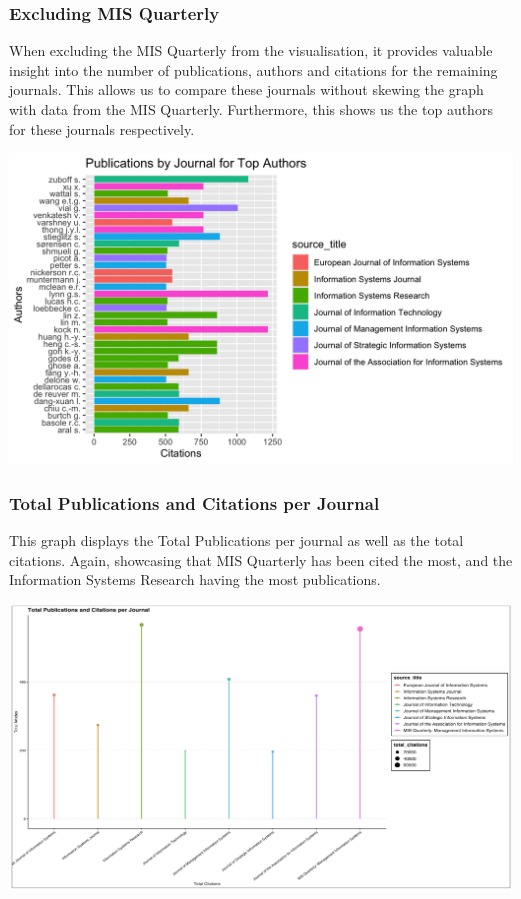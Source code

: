 \documentclass[
  letterpaper,
  DIV=11,
  numbers=noendperiod]{scrartcl}
\begin{document}
\hypertarget{excluding-mis-quarterly}{%
\subsubsection{Excluding MIS Quarterly}\label{excluding-mis-quarterly}}

When excluding the MIS Quarterly from the visualisation, it provides
valuable insight into the number of publications, authors and citations
for the remaining journals. This allows us to compare these journals
without skewing the graph with data from the MIS Quarterly. Furthermore,
this shows us the top authors for these journals respectively.

\includegraphics{images/pub_journ_ex.png}

\hypertarget{total-publications-and-citations-per-journal}{%
\subsubsection{Total Publications and Citations per
Journal}\label{total-publications-and-citations-per-journal}}

This graph displays the Total Publications per journal as well as the
total citations. Again, showcasing that MIS Quarterly has been cited the
most, and the Information Systems Research having the most publications.

\includegraphics{images/pub_cite_journ.png}
\end{document}
